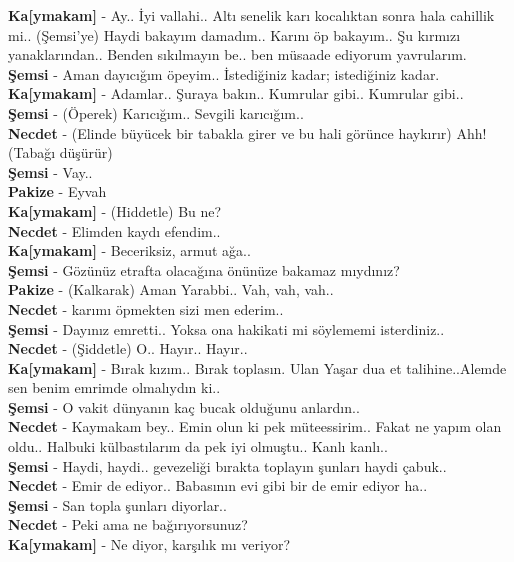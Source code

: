 \documentclass[]{book}
\begin{document}
\textbf{Ka{[}ymakam{]}} - Ay.. İyi vallahi.. Altı senelik karı kocalıktan sonra hala cahillik mi.. (Şemsi'ye) Haydi bakayım damadım.. Karını öp bakayım.. Şu kırmızı yanaklarından.. Benden sıkılmayın be.. ben müsaade ediyorum yavrularım.\\
\textbf{Şemsi} - Aman dayıcığım öpeyim.. İstediğiniz kadar; istediğiniz kadar.\\
\textbf{Ka{[}ymakam{]}} - Adamlar.. Şuraya bakın.. Kumrular gibi.. Kumrular gibi..\\
\textbf{Şemsi} - (Öperek) Karıcığım.. Sevgili karıcığım..\\
\textbf{Necdet} - (Elinde büyücek bir tabakla girer ve bu hali görünce haykırır) Ahh! (Tabağı düşürür)\\
\textbf{Şemsi} - Vay..\\
\textbf{Pakize} - Eyvah\\
\textbf{Ka{[}ymakam{]}} - (Hiddetle) Bu ne?\\
\textbf{Necdet} - Elimden kaydı efendim..\\
\textbf{Ka{[}ymakam{]}} - Beceriksiz, armut ağa..\\
\textbf{Şemsi} - Gözünüz etrafta olacağına önünüze bakamaz mıydınız?\\
\textbf{Pakize} - (Kalkarak) Aman Yarabbi.. Vah, vah, vah..\\
\textbf{Necdet} - karımı öpmekten sizi men ederim..\\
\textbf{Şemsi} - Dayınız emretti.. Yoksa ona hakikati mi söylememi isterdiniz..\\
\textbf{Necdet} - (Şiddetle) O.. Hayır.. Hayır..\\
\textbf{Ka{[}ymakam{]}} - Bırak kızım.. Bırak toplasın. Ulan Yaşar dua et talihine..Alemde sen benim emrimde olmalıydın ki..\\
\textbf{Şemsi} - O vakit dünyanın kaç bucak olduğunu anlardın..\\
\textbf{Necdet} - Kaymakam bey.. Emin olun ki pek müteessirim.. Fakat ne yapım olan oldu.. Halbuki külbastılarım da pek iyi olmuştu.. Kanlı kanlı..\\
\textbf{Şemsi} - Haydi, haydi.. gevezeliği bırakta toplayın şunları haydi çabuk..\\
\textbf{Necdet} - Emir de ediyor.. Babasının evi gibi bir de emir ediyor ha..\\
\textbf{Şemsi} - San topla şunları diyorlar..\\
\textbf{Necdet} - Peki ama ne bağırıyorsunuz?\\
\textbf{Ka{[}ymakam{]}} - Ne diyor, karşılık mı veriyor?\\
\end{document}
